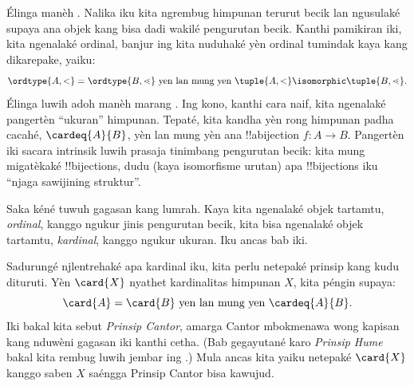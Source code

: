 \documentclass[../../../include/open-logic-section]{subfiles}
\begin{document}

Élinga manèh . Nalika iku kita ngrembug
himpunan terurut becik lan ngusulaké supaya ana objek kang bisa
dadi wakilé pengurutan becik. Kanthi pamikiran iki, kita ngenalaké
ordinal, banjur ing
 kita nuduhaké
yèn ordinal tumindak kaya kang dikarepake, yaiku:
\[
	\ordtype{A, <} = \ordtype{B, \lessdot}
	\text{ yen lan mung yen } \tuple{A, <} \isomorphic \tuple{B, \lessdot}.
\]
Élinga luwih adoh manèh marang .
Ing kono, kanthi cara naif, kita ngenalaké pangertèn “ukuran”
himpunan. Tepaté, kita kandha yèn rong himpunan padha cacahé,
$\cardeq{A}{B}$, yèn lan mung yèn ana !!a{bijection} $f \colon A \to
B$. Pangertèn iki sacara intrinsik {luwih prasaja} tinimbang
pengurutan becik: kita mung migatèkaké !!{bijection}s, dudu
(kaya isomorfisme urutan) apa !!{bijection}s iku “njaga sawijining
struktur”.

Saka kéné tuwuh gagasan kang lumrah. Kaya kita ngenalaké objek
tartamtu, \emph{ordinal}, kanggo ngukur jinis pengurutan becik,
kita bisa ngenalaké objek tartamtu, \emph{kardinal}, kanggo ngukur
ukuran. Iku ancas bab iki.

Sadurungé njlentrehaké apa kardinal iku, kita perlu netepaké
prinsip kang kudu dituruti. Yèn $\card{X}$ nyathet kardinalitas
himpunan $X$, kita péngin supaya:
\[
	\card{A} = \card{B} \text{ yen lan mung yen } \cardeq{A}{B}.
\]
Iki bakal kita sebut \emph{Prinsip Cantor}, amarga Cantor mbokmenawa
wong kapisan kang nduwèni gagasan iki kanthi cetha. (Bab gegayutané
karo \emph{Prinsip Hume} bakal kita rembug luwih jembar ing
.) Mula ancas kita yaiku netepaké $\card{X}$ kanggo
saben $X$ saéngga Prinsip Cantor bisa kawujud.
\end{document}
